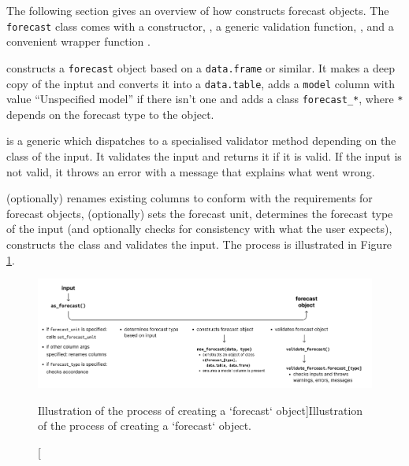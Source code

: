 \documentclass[
]{jss}
\begin{document}
The following section gives an overview of how 
constructs forecast objects. The \texttt{forecast} class comes with a
constructor, , a generic validation function,
, and a convenient wrapper function
.

 constructs a \texttt{forecast} object based on a
\texttt{data.frame} or similar. It makes a deep copy of the inptut and
converts it into a \texttt{data.table}, adds a \texttt{model} column
with value ``Unspecified model'' if there isn't one and adds a class
\texttt{forecast\_*}, where \texttt{*} depends on the forecast type to
the object.

 is a generic which dispatches to a specialised
validator method depending on the class of the input. It validates the
input and returns it if it is valid. If the input is not valid, it
throws an error with a message that explains what went wrong.

 (optionally) renames existing columns to conform
with the requirements for forecast objects, (optionally) sets the
forecast unit, determines the forecast type of the input (and optionally
checks for consistency with what the user expects), constructs the class
and validates the input. The process is illustrated in Figure
\ref{fig:flowchart-validation}.

\begin{CodeChunk}
\begin{figure}[!h]

{\centering \includegraphics[width=1\linewidth]{output/flowchart-create-object} 

}

\caption[Illustration of the process of creating a `forecast` object]{Illustration of the process of creating a `forecast` object.}\label{fig:flowchart-validation}
\end{figure}
\end{CodeChunk}

\clearpage
\end{document}
